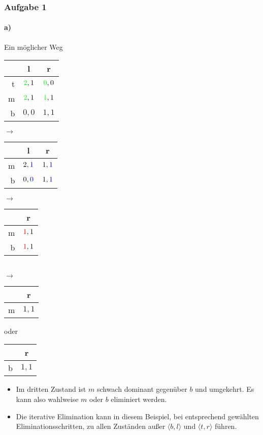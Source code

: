 \documentclass{beamer}
\begin{document}
\begin{frame}
	\frametitle{Aufgabe 1}
	\framesubtitle{a)}
	\begin{block}{Ein möglicher Weg}	
		\centering
		\begin{tabular}{r|c|c|}
			& l & r \\
			\hline
			t & $\textcolor{green}{2}, 1$ & $\textcolor{green}{0}, 0$ \\
			m & $\textcolor{green}{2}, 1$ & $\textcolor{green}{1}, 1$ \\
			b & $0, 0$ & $1, 1$ \\
			\hline
		\end{tabular}
		$\rightarrow$
		\begin{tabular}{r|c|c|}
			& l & r \\
			\hline
			m & $2, \textcolor{blue}{1}$ & $1, \textcolor{blue}{1}$ \\
			b & $0, \textcolor{blue}{0}$ & $1, \textcolor{blue}{1}$ \\
			\hline
		\end{tabular}
		$\rightarrow$
		\begin{tabular}{r|c|}
			& r \\
			\hline
			m & $\textcolor{red}{1}, 1$ \\
			b &  $\textcolor{red}{1}, 1$ \\
			\hline
		\end{tabular}\\
		$\rightarrow$
		\begin{tabular}{r|c|}
			& r \\
			\hline
			m & $1, 1$ \\
			\hline
		\end{tabular}
		oder
		\begin{tabular}{r|c|}
			& r \\
			\hline
			b &  $1, 1$ \\
			\hline
		\end{tabular}	
	\end{block}
	\begin{itemize}
		\item Im dritten Zustand ist $m$ schwach dominant gegenüber $b$ und umgekehrt. Es kann also wahlweise $m$ oder $b$ eliminiert werden.
		\item Die iterative Elimination kann in diesem Beispiel, bei entsprechend gewählten Eliminationsschritten, zu allen Zuständen außer $\langle b, l \rangle$ und $\langle t, r \rangle$ führen.
	\end{itemize}
\end{frame}
\end{document}
